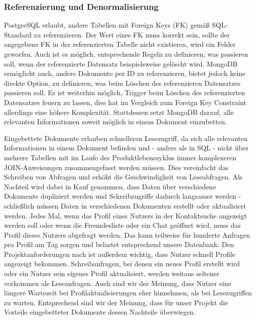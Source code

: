 \subsubsection{Referenzierung und Denormalisierung}
PostgreSQL erlaubt, andere Tabellen mit Foreign Keys (FK) gemäß SQL-Standard zu referenzieren. Der Wert eines FK muss korrekt sein, sollte der angegebene FK in der referenzierten Tabelle nicht existieren, wird ein Fehler geworfen. Auch ist es möglich, entsprechende Regeln zu definieren, was passieren soll, wenn der referenzierte Datensatz beispielsweise gelöscht wird.
MongoDB ermöglicht auch, andere Dokumente per ID zu referenzieren, bietet jedoch keine direkte Option, zu definieren, was beim Löschen des referenzieren Datensatzes passieren soll. Es ist weiterhin möglich, Trigger beim Löschen des referenzierten Datensatzes feuern zu lassen, dies hat im Vergleich zum Foreign Key Constraint allerdings eine höhere Komplexität. Stattdessen setzt MongoDB darauf, alle relevanten Informationen soweit möglich in einem Dokument einzubetten.

Eingebettete Dokumente erlauben schnelleren Lesezugriff, da sich alle relevanten Informationen in einem Dokument befinden und - anders als in SQL - nicht über mehrere Tabellen mit im Laufe des Produktlebenszyklus immer komplexeren JOIN-Anweisungen zusammengefasst werden müssen. Dies vereinfacht das Schreiben von Abfragen und erhöht die Geschwindigkeit von Leseabfragen. Als Nachteil wird dabei in Kauf genommen, dass Daten über verschiedene Dokumente dupliziert werden und Schreibzugriffe dadurch langsamer werden - schließlich müssen Daten in verschiedenen Dokumenten erstellt oder aktualisiert werden. 
Jedes Mal, wenn das Profil eines Nutzers in der Kontaktsuche angezeigt werden soll oder wenn die Freundesliste oder ein Chat geöffnet wird, muss das Profil dieses Nutzers abgefragt werden. Das kann teilweise für hunderte Anfragen pro Profil am Tag sorgen und belastet entsprechend unsere Datenbank. Den Projektanforderungen nach ist außerdem wichtig, dass Nutzer schnell Profile angezeigt bekommen. Schreibanfragen, bei denen ein neues Profil erstellt wird oder ein Nutzer sein eigenes Profil aktualisiert, werden weitaus seltener vorkommen als Leseanfragen. Auch sind wir der Meinung, dass Nutzer eine längere Wartezeit bei Profilaktualisierungen eher hinnehmen, als bei Lesezugriffen zu warten.
Entsprechend sind wir der Meinung, dass für unser Projekt die Vorteile eingebetteter Dokumente dessen Nachteile überwiegen.




